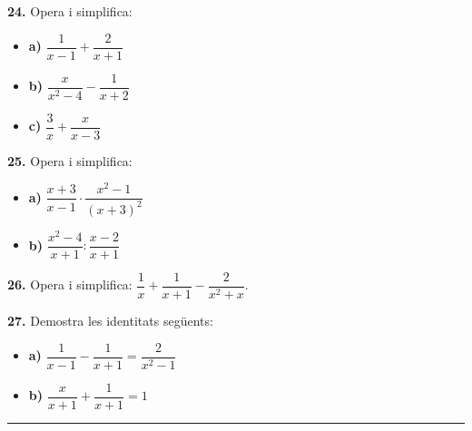 \documentclass[13pt,a4paper]{extarticle}
\begin{document}
\par\noindent\begin{minipage}{\linewidth}
\textbf{24.} Opera i simplifica:\par

\begin{itemize}[leftmargin=0pt,itemsep=3pt,topsep=3pt,parsep=0pt,label={}]
\item \textbf{a)} $\dfrac{1}{x-1}+\dfrac{2}{x+1}$
\item \textbf{b)} $\dfrac{x}{x^2-4}-\dfrac{1}{x+2}$
\item \textbf{c)} $\dfrac{3}{x}+\dfrac{x}{x-3}$
\end{itemize}
\end{minipage}\par\vspace{1.6mm}
\par\noindent\begin{minipage}{\linewidth}
\textbf{25.} Opera i simplifica:\par

\begin{itemize}[leftmargin=0pt,itemsep=3pt,topsep=3pt,parsep=0pt,label={}]
\item \textbf{a)} $\dfrac{x+3}{x-1}\cdot\dfrac{x^2-1}{(x+3)^2}$
\item \textbf{b)} $\dfrac{x^2-4}{x+1}:\dfrac{x-2}{x+1}$
\end{itemize}
\end{minipage}\par\vspace{1.6mm}
\par\noindent\begin{minipage}{\linewidth}
\textbf{26.} Opera i simplifica: $\dfrac{1}{x}+\dfrac{1}{x+1}-\dfrac{2}{x^2+x}$.\par
\end{minipage}\par\vspace{1.6mm}
\par\noindent\begin{minipage}{\linewidth}
\textbf{27.} Demostra les identitats següents:\par

\begin{itemize}[leftmargin=0pt,itemsep=3pt,topsep=3pt,parsep=0pt,label={}]
\item \textbf{a)} $\dfrac{1}{x-1}-\dfrac{1}{x+1}=\dfrac{2}{x^2-1}$
\item \textbf{b)} $\dfrac{x}{x+1}+\dfrac{1}{x+1}=1$
\end{itemize}
\end{minipage}\par\vspace{1.6mm}
\vspace{1mm}\hrule\vspace{3mm}
\end{document}
